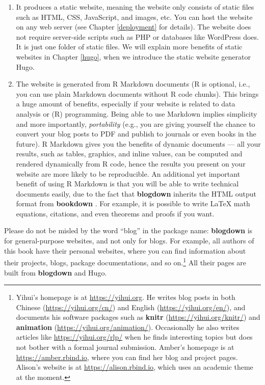 \documentclass[
  12pt,
]{krantz}
\begin{document}
\begin{enumerate}
\def\labelenumi{\arabic{enumi}.}
\item
  It produces a static website, meaning the website only consists of static files such as HTML, CSS, JavaScript, and images, etc. You can host the website on any web server (see Chapter \ref{deployment} for details). The website does not require server-side scripts such as PHP or databases like WordPress does. It is just one folder of static files. We will explain more benefits of static websites in Chapter \ref{hugo}, when we introduce the static website generator Hugo.
\item
  The website is generated from R Markdown documents (R is optional, i.e., you can use plain Markdown documents without R code chunks). This brings a huge amount of benefits, especially if your website is related to data analysis or (R) programming. Being able to use Markdown implies simplicity and more importantly, \emph{portability} (e.g., you are giving yourself the chance to convert your blog posts to PDF and publish to journals or even books in the future). R Markdown gives you the benefits of dynamic documents --- all your results, such as tables, graphics, and inline values, can be computed and rendered dynamically from R code, hence the results you present on your website are more likely to be reproducible. An additional yet important benefit of using R Markdown is that you will be able to write technical documents easily, due to the fact that \textbf{blogdown} inherits the HTML output format from \textbf{bookdown} \citep{xie2016}. For example, it is possible to write LaTeX math equations, citations, and even theorems and proofs if you want.
\end{enumerate}

Please do not be misled by the word ``blog'' in the package name: \textbf{blogdown} is for general-purpose websites, and not only for blogs. For example, all authors of this book have their personal websites, where you can find information about their projects, blogs, package documentations, and so on.\footnote{Yihui's homepage is at \url{https://yihui.org}. He writes blog posts in both Chinese (\url{https://yihui.org/cn/}) and English (\url{https://yihui.org/en/}), and documents his software packages such as \textbf{knitr} (\url{https://yihui.org/knitr/}) and \textbf{animation} (\url{https://yihui.org/animation/}). Occasionally he also writes articles like \url{https://yihui.org/rlp/} when he finds interesting topics but does not bother with a formal journal submission. Amber's homepage is at \url{https://amber.rbind.io}, where you can find her blog and project pages. Alison's website is at \url{https://alison.rbind.io}, which uses an academic theme at the moment.} All their pages are built from \textbf{blogdown} and Hugo.
\end{document}
